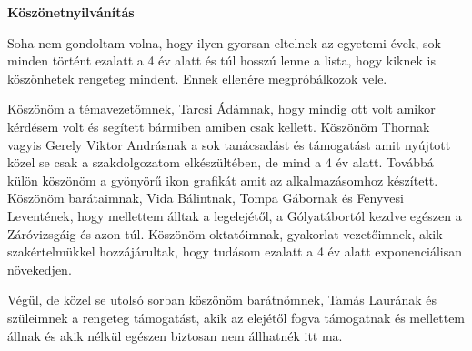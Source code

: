 
\thispagestyle{empty}

\vspace*{\fill}

{\bf \huge {Köszönetnyilvánítás}}

\vspace*{\fill}

Soha nem gondoltam volna, hogy ilyen gyorsan eltelnek az egyetemi évek, sok minden történt ezalatt a 4 év alatt és túl hosszú lenne a lista, hogy kiknek is köszönhetek rengeteg mindent. Ennek ellenére megpróbálkozok vele.

Köszönöm a témavezetőmnek, Tarcsi Ádámnak, hogy mindig ott volt amikor kérdésem volt és segített bármiben amiben csak kellett.
Köszönöm Thornak vagyis Gerely Viktor Andrásnak a sok tanácsadást és támogatást amit nyújtott közel se csak a szakdolgozatom elkészültében, de mind a 4 év alatt. Továbbá külön köszönöm a gyönyörű ikon grafikát amit az alkalmazásomhoz készített.
Köszönöm barátaimnak, Vida Bálintnak, Tompa Gábornak és Fenyvesi Leventének, hogy mellettem álltak a legelejétől, a Gólyatábortól kezdve egészen a Záróvizsgáig és azon túl.
Köszönöm oktatóimnak, gyakorlat vezetőimnek, akik szakértelmükkel hozzájárultak, hogy tudásom ezalatt a 4 év alatt exponenciálisan növekedjen.

Végül, de közel se utolsó sorban köszönöm barátnőmnek, Tamás Laurának és szüleimnek a rengeteg támogatást, akik az elejétől fogva támogatnak és mellettem állnak és akik nélkül egészen biztosan nem állhatnék itt ma.

\vspace*{\fill}
